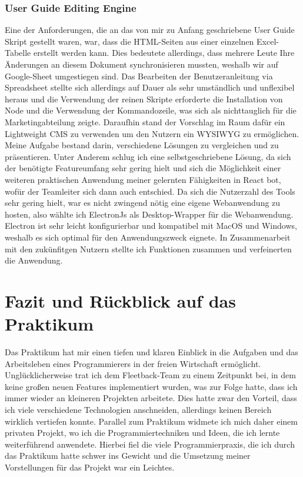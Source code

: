 \documentclass[a4paper, 11pt]{article}
\begin{document}
\subsubsection{User Guide Editing Engine}
Eine der Anforderungen, die an das von mir zu Anfang geschriebene User Guide Skript gestellt waren, war, dass die HTML-Seiten aus einer einzelnen Excel-Tabelle erstellt werden kann. Dies bedeutete allerdings, dass mehrere Leute Ihre Änderungen an diesem Dokument synchronisieren mussten, weshalb wir auf Google-Sheet umgestiegen sind. Das Bearbeiten der Benutzeranleitung via Spreadsheet stellte sich allerdings auf Dauer als sehr umständlich und unflexibel heraus und die Verwendung der reinen Skripte erforderte die Installation von Node und die Verwendung der Kommandozeile, was sich als nichttauglich für die Marketingabteilung zeigte. Daraufhin stand der Vorschlag im Raum dafür ein Lightweight CMS zu verwenden um den Nutzern ein WYSIWYG zu ermöglichen. Meine Aufgabe bestand darin, verschiedene Lösungen zu vergleichen und zu präsentieren. Unter Anderem schlug ich eine selbstgeschriebene Lösung, da sich der benötigte Featureumfang sehr gering hielt und sich die Möglichkeit einer weiteren praktischen Anwendung meiner gelernten Fähigkeiten in React bot, wofür der Teamleiter sich dann auch entschied. Da sich die Nutzerzahl des Tools sehr gering hielt, war es nicht zwingend nötig eine eigene Webanwendung zu hosten, also wählte ich ElectronJs als Desktop-Wrapper für die Webanwendung. Electron ist sehr leicht konfigurierbar und kompatibel mit MacOS und Windows, weshalb es sich optimal für den Anwendungszweck eignete. In Zusammenarbeit mit den zukünfitgen Nutzern stellte ich Funktionen zusammen und verfeinerten die Anwendung.
\newpage
\section{Fazit und Rückblick auf das Praktikum}
Das Praktikum hat mir einen tiefen und klaren Einblick in die Aufgaben und das Arbeitsleben eines Programmierers in der freien Wirtschaft ermöglicht. Unglücklicherweise trat ich dem Fleetback-Team zu einem Zeitpunkt bei, in dem keine großen neuen Features implementiert wurden, was zur Folge hatte, dass ich immer wieder an kleineren Projekten arbeitete. Dies hatte zwar den Vorteil, dass ich viele verschiedene Technologien anschneiden, allerdings keinen Bereich wirklich vertiefen konnte. Parallel zum Praktikum widmete ich mich daher einem privaten Projekt, wo ich die Programmiertechniken und Ideen, die ich lernte weiterführend anwendete. Hierbei fiel die viele Programmierpraxis, die ich durch das Praktikum hatte schwer ins Gewicht und die Umsetzung meiner Vorstellungen für das Projekt war ein Leichtes.
\end{document}
